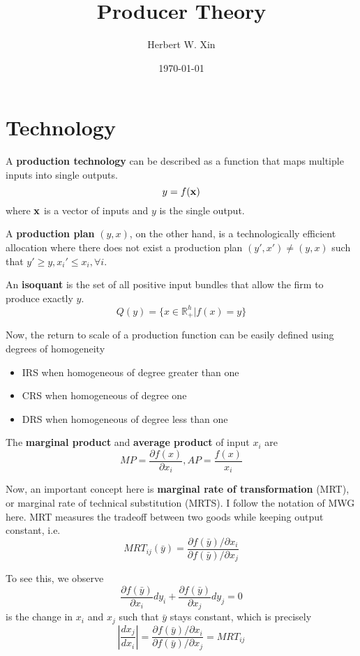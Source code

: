 \documentclass[twocolumn, fleqn]{article}
\begin{document}
	\title{Producer Theory}
	\author{Herbert W. Xin}
	\date{\today}
	\maketitle

	\tableofcontents
	\thispagestyle{fancy}
	
	\section{Technology}
		A \textbf{production technology} can be described as a function that maps multiple inputs into single outputs.
		\[ y = f(\bold x)\]
		where $\bold x$ is a vector of inputs and $y$ is the single output.
		
		
		A \textbf{production plan} $(y, x)$, on the other hand, is a technologically efficient allocation where there does not exist a production plan $(y', x') \neq (y, x)$ such that $y' \geq y, x_i' \leq x_i, \forall i$.
		
		An \textbf{isoquant} is the set of all positive input bundles that allow the firm to produce exactly $y$.
		\[Q(y) = \lbrace x \in \mathbb R_+^h | f(x)=y \rbrace \]
		
		Now, the return to scale of a production function can be easily defined using degrees of homogeneity 
		\begin{itemize}
			\item IRS when homogeneous of degree greater than one
			\item CRS when homogeneous of degree one
			\item DRS when homogeneous of degree less than one
		\end{itemize}
		
		The \textbf{marginal product} and \textbf{average product} of input $x_i$ are 
		\[ MP = \frac{\partial f(x)}{\partial x_i}, AP = \frac{f(x)}{x_i}\]
		
		Now, an important concept here is \textbf{marginal rate of transformation} (MRT), or marginal rate of technical substitution (MRTS). I follow the notation of MWG here. 
		MRT measures the tradeoff between two goods while keeping output constant, i.e. 
		\[MRT_{ij}(\bar y) = \frac{\partial f(\bar y) / \partial x_i}{\partial f(\bar y) / \partial x_j}\]
		
		To see this, we observe 
		\[\frac{\partial f(\bar y)}{\partial x_i} d y_i + \frac{\partial f(\bar y)}{\partial x_j}dy_j=0\] 
		is the change in $x_i$ and $x_j$ such that $\bar y$ stays constant, which is precisely 
		\[\left|\frac{d x_j}{d x_i}\right| = \frac{\partial f(\bar y) / \partial x_i}{\partial f(\bar y) / \partial x_j} = MRT_{ij}\]
		
\end{document}
